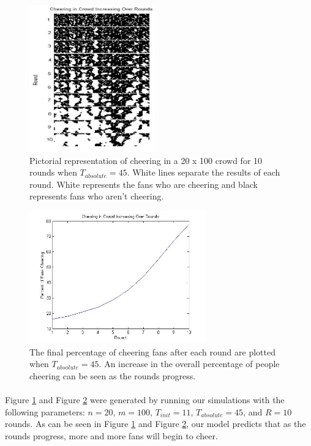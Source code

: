 \documentclass[oneside,12pt]{report}
\begin{document}
\begin{figure}[h]
    \begin{center}
        \includegraphics[height=2.5in]{sample_graph.jpg}
    \end{center}
    \caption[Pictorial representation of the progression of cheering over time with a lower absolute threshold.]{Pictorial representation of cheering in a 20 x 100 crowd for 10 rounds when $T_{absolute}=45$. White lines separate the results of each round. White represents the fans who are cheering and black represents fans who aren't cheering.}
    \label{fig:graph1}
\end{figure}

\begin{figure}[h]
    \begin{center}
        \includegraphics[width=3in]{sample_graph2.jpg}
    \end{center}
    \caption[Plot of cheering levels over time in a simulated crowd with a lower absolute threshold.]{The final percentage of cheering fans after each round are plotted when $T_{absolute}=45$.  An increase in the overall percentage of people cheering can be seen as the rounds progress.}
    \label{fig:graph2}
\end{figure}

\paragraph{}
Figure \ref{fig:graph1} and Figure \ref{fig:graph2} were generated by running our simulations with the following parameters: $n=20$, $m=100$, $T_{init}=11$, $T_{absolute}=45$, and $R=10$ rounds. As can be seen in Figure \ref{fig:graph1} and Figure \ref{fig:graph2}, our model predicts that as the rounds progress, more and more fans will begin to cheer. 
\end{document}

